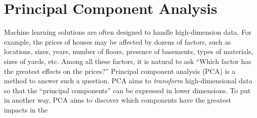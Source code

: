 \chapter{Principal Component Analysis}
\label{chapter:pca}

Machine learning solutions are often designed to handle high-dimension
data. For example, the prices of houses may be affected by dozens of
factors, such as locations, sizes, years, number of floors, presence
of basements, types of materials, sizes of yards, etc.  Among all
these factors, it is natural to ask ``Which factor has the greatest
effects on the prices?''  Principal component analysis (PCA) is a
method to answer such a question.  PCA aims to {\it transform}
high-dimensional data so that the ``principal components'' can be
expressed in lower dimensions.  To put in another way, PCA aims to
discover which components have the greatest impacts in the



